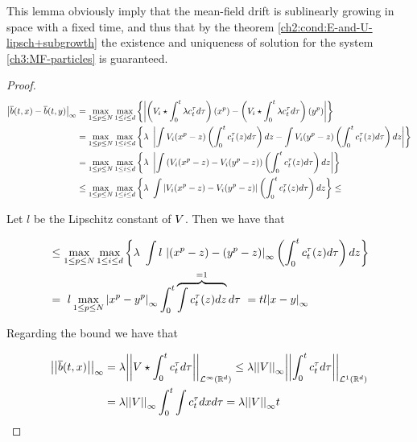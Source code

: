 \begin{remark}
	This lemma obviously imply that the mean-field drift is sublinearly growing in space with a fixed time, and thus that by the theorem \ref{ch2:cond:E-and-U-lipsch+subgrowth} the existence and uniqueness of solution for the system \ref{ch3:MF-particles} is guaranteed.
\end{remark}

\begin{proof}
	\begin{align*}
		\normp{\infty}{\mfdrift(t,x) - \mfdrift(t,y)}
		&=
		\max_{1\leq p\leq N}
		\max_{1\leq i \leq d}
		\left\{
			\abs{\left( 
				\attraction_i \star \int_0^t \lambda \cdens_t^\tau 	d \tau
				\right) (x^p) 
				-
				\left( 
				\attraction_i \star \int_0^t \lambda \cdens_t^\tau 	d \tau
				\right) (y^p) 
			}
		\right\}
		\\
		&=
		\max_{1\leq p\leq N}
		\max_{1\leq i \leq d}
		\left\{
		\lambda\
		\abs{
			\int
			\attraction_i (x^p-z)
			\left( 
			\int_0^t \cdens_t^\tau (z)	d \tau
			\right)
			dz
			-
			\int 
			\attraction_i (y^p-z) 
			\left( 
			\int_0^t \cdens_t^\tau (z)	d \tau
			\right)
			dz 
		}
		\right\}
		\\
		&=
		\max_{1\leq p\leq N}
		\max_{1\leq i \leq d}
		\left\{
		\lambda\
		\abs{
			\int
			\left( \attraction_i (x^p-z) - \attraction_i (y^p-z) \right)
			\left( 
			\int_0^t \cdens_t^\tau (z)	d \tau
			\right)
			dz
		}
		\right\}
		\\
		&\leq
		\max_{1\leq p\leq N}
		\max_{1\leq i \leq d}
		\left\{
		\lambda\
		\int
			\abs{ \attraction_i (x^p-z) - \attraction_i (y^p-z) }
			\left( 
			\int_0^t \cdens_t^\tau (z)	d \tau
			\right)
		dz
		\right\}
		\leq
	\end{align*}
	
	Let $l$ be the Lipschitz constant of $\attraction$.
	Then we have that
	
	\begin{align*}
		&\leq
		\max_{1\leq p\leq N}
		\max_{1\leq i \leq d}
		\left\{
		\lambda\
		\int
		l\
		\normp{\infty}{ (x^p-z) - (y^p-z) }
		\left( 
		\int_0^t \cdens_t^\tau (z)	d \tau
		\right)
		dz
		\right\}
		\\
		&=\
		l		
		\max_{1\leq p\leq N}
		\normp{\infty}{x^p-y^p}
		\int_0^t 
		\overbrace{
			\int
			\cdens_t^\tau (z)
			dz
		}^{=1}
		d \tau\
		=
		tl
		\normp{\infty}{x-y}
	\end{align*}
	
	Regarding the bound we have that
	
	\begin{align*}
		\Normp{\infty}{\mfdrift(t,x)}
		&=
		\lambda
		\Normp{\Lpspace^\infty(\R^d)}
		{
			\attraction \star \int_0^t \cdens_t^\tau 	d \tau
		}
		\leq
		\lambda
		\Normp{\infty}{
			\attraction
		}
		\Normp{\Lpspace^1(\R^d)}
		{
			\int_0^t \cdens_t^\tau 	d \tau
		}
		\\
		&=
		\lambda
		\Normp{\infty}
		{
			\attraction
		}
		\int_0^t \int \cdens_t^\tau dx	d \tau
		=
		\lambda
		\Normp{\infty}
		{
			\attraction
		}
		t
	\end{align*}
\end{proof}

